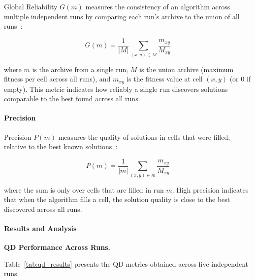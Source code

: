 Global Reliability $G(m)$ measures the consistency of an algorithm across multiple independent runs by comparing each run's archive to the union of all runs~\cite{cully2015robots}:

\begin{equation}
G(m) = \frac{1}{|M|} \sum_{(x,y) \in M} \frac{m_{xy}}{M_{xy}}
\end{equation}

\noindent where $m$ is the archive from a single run, $M$ is the union archive (maximum fitness per cell across all runs), and $m_{xy}$ is the fitness value at cell $(x,y)$ (or 0 if empty). This metric indicates how reliably a single run discovers solutions comparable to the best found across all runs.

\paragraph{Precision}

Precision $P(m)$ measures the quality of solutions in cells that were filled, relative to the best known solutions~\cite{cully2015robots}:

\begin{equation}
P(m) = \frac{1}{|m|} \sum_{(x,y) \in m} \frac{m_{xy}}{M_{xy}}
\end{equation}

\noindent where the sum is only over cells that are filled in run $m$. High precision indicates that when the algorithm fills a cell, the solution quality is close to the best discovered across all runs.

\paragraph{Results and Analysis}

\textbf{QD Performance Across Runs.}

Table~\ref{tab:qd_results} presents the QD metrics obtained across five independent runs.

